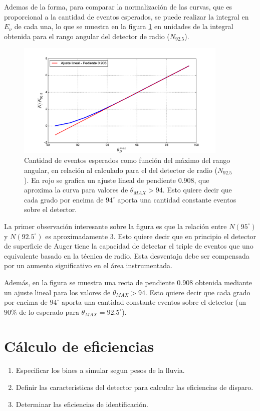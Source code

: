 	Ademas de la forma, para comparar la normalizaci\'on de las curvas, que es proporcional a la cantidad de eventos esperados, se puede realizar la integral en $E_\nu$ de cada una, lo que se muestra en la figura \ref{fig:gainThetas} en unidades de la integral obtenida para el rango angular del detector de radio ($N_{92.5}$). 
	\begin{figure}[h!]
		\begin{center}
			\includegraphics[width=0.9\textwidth]{fig/resultadosRadio/eventGain_thetas}
			\caption{\label{fig:gainThetas} Cantidad de eventos esperados como funci\'on del m\'aximo del rango angular, en relaci\'on al calculado para el del detector de radio ($N_{92.5}$).
			En rojo se grafica un ajuste lineal de pendiente 0.908, que aproxima la curva para valores de $\theta_{MAX}>94$.
			Esto quiere decir que cada grado por encima de $94^\circ$ aporta una cantidad constante eventos sobre el detector.
			}
		\end{center}
	\end{figure}
	La primer observaci\'on interesante sobre la figura es que la relaci\'on entre $N(95^\circ)$ y $N(92.5^\circ)$ es aproximadamente 3.
	Esto quiere decir que en principio el detector de superficie de Auger tiene la capacidad de detectar el triple de eventos que uno equivalente basado en la t\'ecnica de radio.
	Esta desventaja debe ser compensada por un aumento significativo en el \'area instrumentada.
	
	Adem\'as, en la figura se muestra una recta de pendiente 0.908 obtenida mediante un ajuste lineal para los valores de $\theta_{MAX}>94$.
	Esto quiere decir que cada grado por encima de $94^\circ$ aporta una cantidad constante eventos sobre el detector (un $90\%$ de lo esperado para $\theta_{MAX}=92.5^\circ$).
	
\section{C\'alculo de eficiencias}
\label{sc:effRadio}
	\begin{enumerate}
	 \item Especificar los bines a simular segun pesos de la lluvia.
	 \item Definir las caracteristicas del detector para calcular las eficiencias de disparo.
	 \item Determinar las eficiencias de identificaci\'on.
	\end{enumerate}

